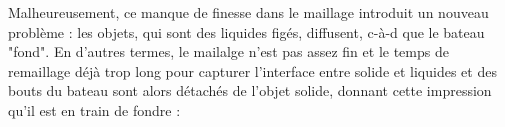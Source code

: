 \documentclass[../main.tex]{subfiles}
\begin{document}
Malheureusement, ce manque de finesse dans le maillage introduit un nouveau problème : les objets, qui sont des liquides figés, diffusent, c-à-d que le bateau "fond". En d'autres termes, le mailalge n'est pas assez fin et le temps de remaillage déjà trop long pour capturer l'interface entre solide et liquides et des bouts du bateau sont alors détachés de l'objet solide, donnant cette impression qu'il est en train de fondre :
\end{document}
